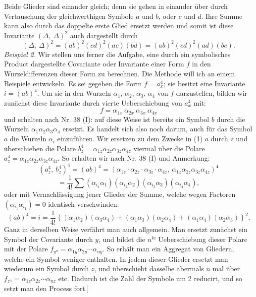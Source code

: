 Beide Glieder sind einander gleich; denn sie gehen in einander über
durch Vertauschung der gleichwerthigen Symbole $a$ und $b$, oder $c$
und $d$. Ihre Summe kann also durch das doppelte erste Glied ersetzt
werden und somit ist diese Invariante $(\Delta,\ \Delta)^2$ auch dargestellt durch
\[
(\Delta,\ \Delta)^2 = (ab)^2(cd)^2(ac)(bd) = (ab)^2(cd)^2(ad)(bc).
\]
\textit{Beispiel 2.} Wir stellen uns ferner die Aufgabe, eine durch ein
symbolisches Product dargestellte Covariante oder Invariante einer
Form $f$ in den Wurzeldifferenzen dieser Form zu berechnen. Die
Methode will ich an einem Beispiele entwickeln. Es sei gegeben die
Form $f = a_x^4$; sie besitzt eine Invariante $i = (ab)^4$. Um sie in den
Wurzeln $\alpha_1$, $\alpha_2$, $\alpha_3$, $\alpha_4$ von $f$ darzustellen, bilden wir zunächst diese
Invariante durch vierte Ueberschiebung von $a_x^4$ mit:
\[
f = \alpha_{1x}\ \alpha_{2x}\ \alpha_{3x}\ \alpha_{4x}
\]
und erhalten nach Nr. 38 (I):
auf diese Weise ist bereits ein Symbol $b$ durch die Wurzeln $\alpha_1\alpha_2\alpha_3\alpha_4$
ersetzt. Es handelt sich also noch darum, auch für das Symbol $a$ die
Wurzeln $\alpha_i$ einzuführen. Wir ersetzen zu dem Zwecke in (1) $a$ durch
$z$ und überschieben die Polare $b_z^4 = \alpha_{1z}\alpha_{2z}\alpha_{3z}\alpha_{4z}$ viermal über die
Polare $a_z^4 = \alpha_{1z}\alpha_{2z}\alpha_{3z}\alpha_{4z}$. So erhalten wir nach Nr. 38 (I) und An\-merkung:
\[
(a_z^4,\ b_z^4)^4 = (ab)^4 = (\alpha_{1z}\cdot\alpha_{2z}\cdot\alpha_{3z}\cdot\alpha_{4z},\ \alpha_{1z}\alpha_{2z}\alpha_{3z}\alpha_{4z})^4
\]
\[
= \frac{1}{4!}\sum (\alpha_{i_1}\alpha_1)(\alpha_{i_2}\alpha_2)(\alpha_{i_3}\alpha_3)(\alpha_{i_4}\alpha_4),
\]
oder mit Vernachlässigung jener Glieder der Summe, welche wegen
Factoren $(\alpha_{i_1}\alpha_{i_1}) = 0$ identisch verschwinden:
\[
(ab)^4 = i = \frac{1}{4!}\left\{(\alpha_1\alpha_2)(\alpha_3\alpha_4) + (\alpha_1\alpha_3)(\alpha_2\alpha_4) + (\alpha_1\alpha_4)(\alpha_2\alpha_3)\right\}^2.
\]
Ganz in derselben Weise verfährt man auch allgemein. Man ersetzt
zunächst ein Symbol der Covariante durch $y$, und bildet die
$n^{\text{te}}$ Ueberschiebung dieser Polare mit der Polare $f_{y^n} = \alpha_{1y}\alpha_{2y}\cdots\alpha_{ny}$.
So erhält man ein Aggregat von Gliedern, welche ein Symbol
weniger enthalten. In jedem dieser Glieder ersetzt man wiederum ein
Symbol durch $z$, und überschiebt dasselbe abermals $n$ mal über
$f_{z^n} = \alpha_{1z}\alpha_{2z}\cdots\alpha_{nz}$ etc. Dadurch ist die Zahl der Symbole um 2
reducirt, und so setzt man den Process fort.] %

